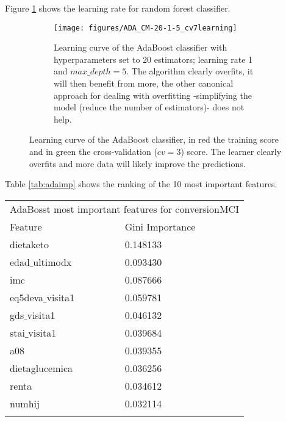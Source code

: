 \documentclass[11pt]{article}
\theoremstyle{definition}
\theoremstyle{remark}
\begin{document}
Figure \ref{fig:rf_learning} shows the learning rate for random forest classifier. 
\begin{figure}[H]
    \centering
    \begin{subfigure}[t]{.8\textwidth}
        \centering
        \texttt{[image: figures/ADA\_CM-20-1-5\_cv7learning]}
        \caption{Learning curve of the AdaBoost classifier with  hyperparameters set to 20 estimators; learning rate 1 and  $max\_depth=5$. The algorithm clearly overfits, it will then benefit from more, the other canonical approach for dealing with overfitting -simplifying the model (reduce the number of estimators)- does not help.}
    \end{subfigure}

    
    \caption{Learning curve of the AdaBoost classifier, in red the training score and in green the cross-validation ($cv=3$) score. The learner clearly overfits and more data will likely improve the predictions.} \label{fig:rf_learning}
\end{figure}

Table \ref{tab:adaimp} shows the ranking of the 10 most important features.
\begin{tabular}{ll}
\hline
\multicolumn{2}{c}{AdaBosst most important features for conversionMCI} \\
\cline{1-2}
Feature    & Gini Importance  \\
\hline
dietaketo      & 0.148133         \\
edad$\_$ultimodx  & 0.093430        \\
imc        & 0.087666      \\
eq5deva$\_$visita1 & 0.059781         \\
gds$\_$visita1 & 0.046132           \\
stai$\_$visita1 & 0.039684               \\
a08 & 0.039355             \\
dietaglucemica & 0.036256          \\
renta &  0.034612           \\
numhij & 0.032114     \\

\hline
\label{tab:adaimp}
\end{tabular}
\end{document}
